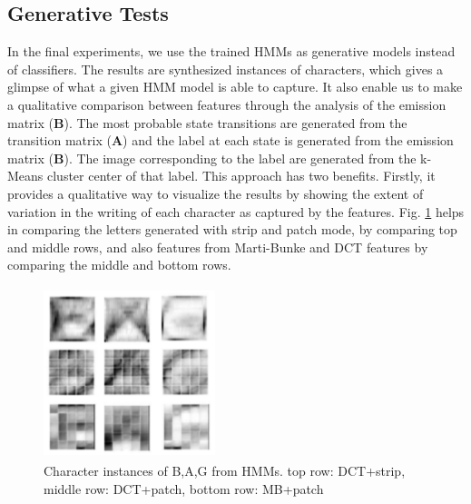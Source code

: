 \documentclass[runningheads]{llncs}
\def\A{{\mathbf A}}
\def\B{{\mathbf B}}
\begin{document}
{\subsection{Generative Tests}
In the final experiments, we use the trained HMMs as generative models instead of classifiers. The results are synthesized instances of characters, which gives a glimpse of what a given HMM model is able to capture. It also enable us to make a qualitative comparison between features through the analysis of the emission matrix ($\B$). The most probable state transitions are generated from the transition matrix ($\A$) and the label at each state is generated from the emission matrix ($\B$). The image corresponding to the label are generated from the k-Means cluster center of that label. This approach has two benefits. Firstly, it provides a qualitative way to visualize the results by showing the extent of variation in the writing of each character as captured by the features. Fig. {\ref{fig:chars}} helps in comparing the letters generated with strip and patch mode, by comparing top and middle rows, and also features from Marti-Bunke and DCT features by comparing the middle and bottom rows.


\begin{figure}[!h]
\begin{minipage}[b]{1.0\linewidth}
  \centering
  \centerline{\includegraphics[width=5.0cm,height=5.0cm]{char}}
\end{minipage}
\caption{Character instances of B,A,G from HMMs. top row: DCT+strip, middle row: DCT+patch, bottom row: MB+patch}
\label{fig:chars}
\end{figure}

}
\end{document}
